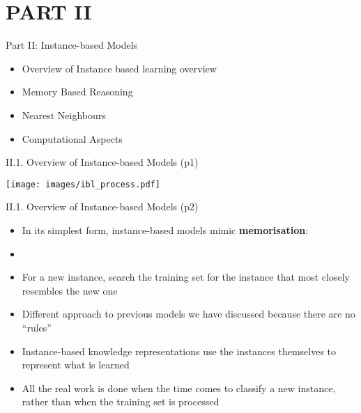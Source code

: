 \documentclass[handout]{beamer}
\newcommand{\strong}[1]{\textbf{\color{teal} #1}}
\begin{document}
\section{PART II}
\begin{frame}{Part II: Instance-based Models}
\begin{itemize}
\item[II.1.] Overview of Instance based learning overview
\item[II.2.] Memory Based Reasoning
\item[II.3.] Nearest Neighbours
\item[II.4.] Computational Aspects
\end{itemize}
\end{frame}
\begin{frame}{II.1. Overview of Instance-based Models (p1)}
\begin{center}
\texttt{[image: images/ibl\_process.pdf]}
\end{center}
\end{frame}
\begin{frame}{II.1. Overview of Instance-based Models (p2)} %
\begin{itemize}
\item In its simplest form, instance-based models mimic \strong{memorisation}:
\item[]
\item For a new instance, search the training set for the instance that most closely resembles the new one
\item Different approach to previous models we have discussed because there are no ``rules''
\item Instance-based knowledge representations use the instances themselves to represent what is learned
\item All the real work is done when the time comes to classify a new instance, rather than when the training set is processed
\end{itemize}
\end{frame}
\end{document}
